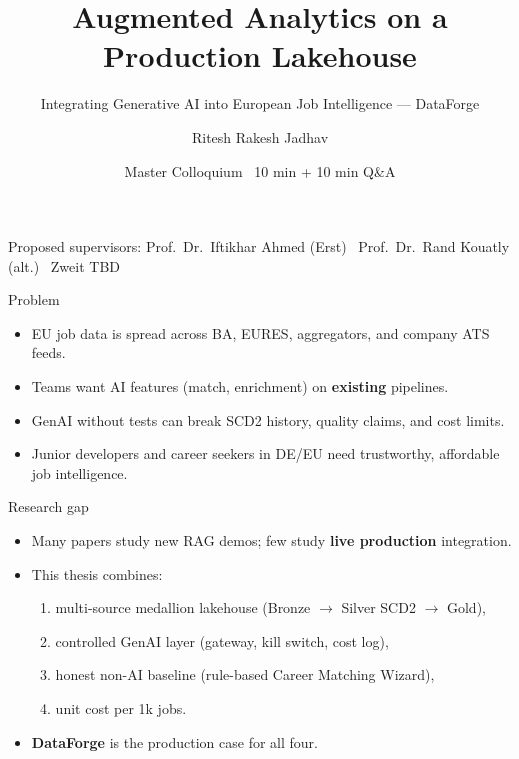\documentclass[aspectratio=169,11pt]{beamer}
\title{Augmented Analytics on a Production Lakehouse}
\subtitle{Integrating Generative AI into European Job Intelligence --- DataForge}
\author{Ritesh Rakesh Jadhav}
\institute{M.Sc.\ Data Science\\University of Europe for Applied Sciences, Potsdam}
\date{Master Colloquium \textbullet\ 10 min + 10 min Q\&A}
\begin{document}
\begin{frame}
  \titlepage
  \vspace{-0.4cm}
  \small
  Proposed supervisors: Prof.\ Dr.\ Iftikhar Ahmed (Erst) \textbar\
  Prof.\ Dr.\ Rand Kouatly (alt.) \textbar\ Zweit TBD
\end{frame}

\begin{frame}{Problem}
  \begin{itemize}
    \item EU job data is spread across BA, EURES, aggregators, and company ATS feeds.
    \item Teams want AI features (match, enrichment) on \textbf{existing} pipelines.
    \item GenAI without tests can break SCD2 history, quality claims, and cost limits.
    \item Junior developers and career seekers in DE/EU need trustworthy, affordable job intelligence.
  \end{itemize}
\end{frame}

\begin{frame}{Research gap}
  \begin{itemize}
    \item Many papers study new RAG demos; few study \textbf{live production} integration.
    \item This thesis combines:
      \begin{enumerate}
        \item multi-source medallion lakehouse (Bronze $\rightarrow$ Silver SCD2 $\rightarrow$ Gold),
        \item controlled GenAI layer (gateway, kill switch, cost log),
        \item honest non-AI baseline (rule-based Career Matching Wizard),
        \item unit cost per 1k jobs.
      \end{enumerate}
    \item \textbf{DataForge} is the production case for all four.
  \end{itemize}
\end{frame}
\end{document}
